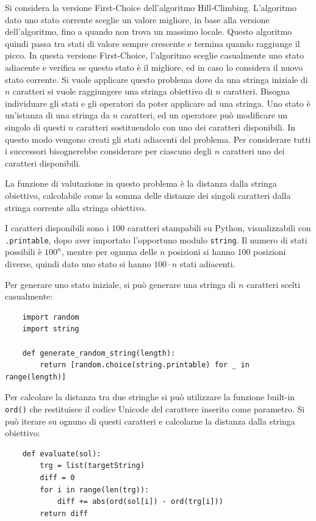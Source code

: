 \documentclass{article}
\numberwithin{equation}{subsection}
\begin{document}
Si considera la versione First-Choice dell'algoritmo Hill-Climbing. L'algoritmo dato uno stato corrente sceglie un valore migliore, in base alla versione dell'algoritmo, fino a quando 
non trova un massimo locale. Questo algoritmo quindi passa tra stati di valore sempre crescente e termina quando raggiunge il picco. 
In questa versione First-Choice, l'algoritmo sceglie casualmente uno stato adiacente e verifica se questo stato è il migliore, ed in caso lo considera il nuovo stato corrente. 
Si vuole applicare questo problema dove da una stringa iniziale di $n$ caratteri si vuole raggiungere una stringa obiettivo di $n$ caratteri. 
Bisogna individuare gli stati e gli operatori da poter applicare ad una stringa. Uno stato è un'istanza di una stringa da $n$ caratteri, ed un operatore può modificare un singolo di questi 
$n$ caratteri sostituendolo con uno dei caratteri disponibili. In questo modo vengono creati gli stati adiacenti del problema. 
Per considerare tutti i successori bisognerebbe considerare per ciascuno degli $n$ caratteri uno dei caratteri disponibili. 

La funzione di valutazione in questo problema è la distanza dalla stringa obiettivo, calcolabile come la somma delle distanze dei singoli caratteri dalla stringa corrente alla stringa obiettivo. 

I caratteri disponibili sono i $100$ caratteri stampabili su Python, visualizzabili con \verb|.printable|, dopo aver importato l'opportuno modulo \verb|string|. Il numero di stati possibili è $100^n$, 
mentre per ognuna delle $n$ posizioni si hanno $100$ posizioni diverse, quindi dato uno stato si hanno $100\cdot n$ stati adiacenti. 

Per generare uno stato iniziale, si può generare una stringa di $n$ caratteri scelti casualmente:
\begin{verbatim}
    import random
    import string
    
    def generate_random_string(length):
        return [random.choice(string.printable) for _ in range(length)]
\end{verbatim}

Per calcolare la distanza tra due stringhe si può utilizzare la funzione built-in \verb|ord()| che restituisce il codice Unicode del carattere inserito come parametro. Si può iterare su ognuno di questi caratteri 
e calcolarne la distanza dalla stringa obiettivo:
\begin{verbatim}
    def evaluate(sol):
        trg = list(targetString)
        diff = 0
        for i in range(len(trg)):
            diff += abs(ord(sol[i]) - ord(trg[i]))
        return diff
\end{verbatim}
\end{document}
